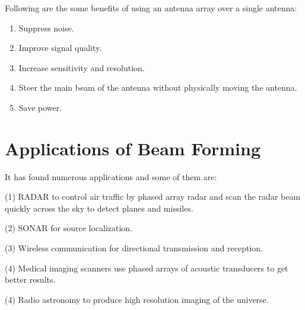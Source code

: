 Following are the some benefits of using an antenna array over a single antenna:
%
\begin{enumerate}
   \item Suppress noise.
   \item Improve signal quality.
   \item Increase sensitivity and resolution.
   \item Steer the main beam of the antenna without physically moving the antenna.
   \item Save power.
\end{enumerate}


\section{Applications of Beam Forming}

It has found numerous applications and some of them are:

(1) RADAR to control air traffic by phased array radar and scan the radar beam quickly across the sky to detect planes and missiles.

(2) SONAR for source localization.

(3) Wireless communication for directional transmission and reception.

(4) Medical imaging scanners use phased arrays of acoustic transducers to get better results.

(4) Radio astronomy to produce high resolution imaging of the universe. 
